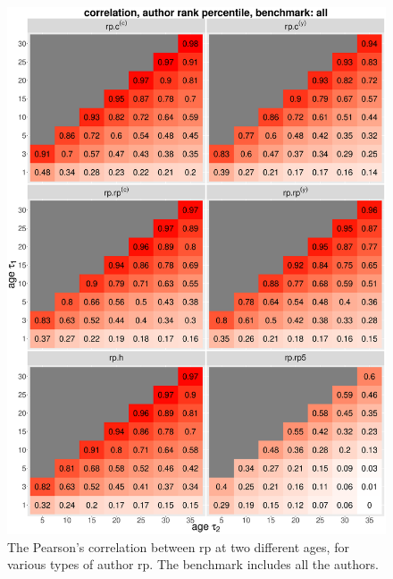 \iffalse
\begin{figure}[ht!]
    \centering
    \includegraphics[width=\textwidth]{figures/pred_power/autrp/heatmap_cor_all.eps}
    \caption{The Pearson's correlation between rp at two different ages, for various types of author rp. The benchmark includes all the authors.}
    \label{fig:hm_autrp_all}
\end{figure}
